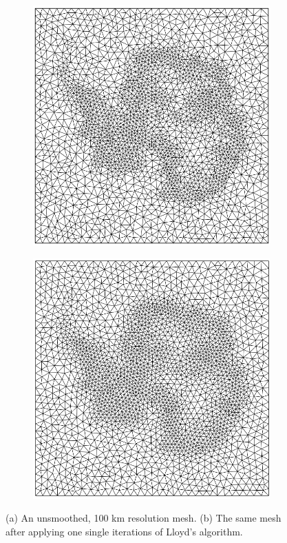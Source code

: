 \documentclass{article}
\begin{document}
\begin{figure}[H] \label{fig:mesh_Lloyds_algorithm}
  \centering
  \begin{subfigure}[b]{0.3\linewidth}
    \includegraphics[width=\linewidth]{Fig_mesh_Lloyd_01.png}
    \caption{}
  \end{subfigure}
  \begin{subfigure}[b]{0.3\linewidth}
    \includegraphics[width=\linewidth]{Fig_mesh_Lloyd_02.png}
    \caption{}
  \end{subfigure}
  \caption{(a) An unsmoothed, 100 km resolution mesh. (b) The same mesh after applying one single iterations of Lloyd's algorithm.}
\end{figure}
\end{document}
